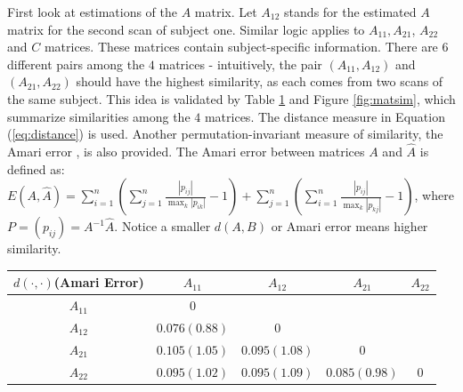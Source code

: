 \documentclass[fleqn,12pt]{article}
\let\oldref\ref
\renewcommand{\ref}[1]{(\oldref{#1})}
\begin{document}
First look at estimations of the $A$ matrix. Let $A_{12}$ stands for the estimated $A$ matrix for the second scan of subject one. Similar logic applies to $A_{11}, A_{21}$, $A_{22}$ and $C$ matrices. These matrices contain subject-specific information. There are $6$ different pairs among the $4$ matrices - intuitively, the pair $(A_{11},A_{12})$ and $(A_{21},A_{22})$ should have the highest similarity, as each comes from two scans of the same subject. This idea is validated by Table \oldref{tab:similarity} and Figure \oldref{fig:matsim}, which summarize similarities among the  $4$ matrices. The distance measure in Equation \ref{eq:distance} is used. Another permutation-invariant measure of similarity, the Amari error \citep{amari1996new}, is also provided. The Amari error between matrices $A$ and $\hat{A}$ is defined as: $E(A,\hat{A}) = \sum\limits_{i=1}^n(\sum\limits_{j=1}^n\frac{|p_{ij}|}{\max_k |p_{ik}|}-1) + \sum\limits_{j=1}^n(\sum\limits_{i=1}^n\frac{|p_{ij}|}{\max_k|p_{kj}|}-1)$, where $P =(p_{ij})=A^{-1}\hat{A}$. Notice a smaller $d(A,B)$ or Amari error means higher similarity.

\begin{table}
\centering
{}
\label{tab:similarity}
\begin{tabular}{c|cccc}
\hline
$d(\cdot,\cdot)$(Amari Error) & $A_{11}$&$A_{12}$ & $A_{21}$&$A_{22}$ \\
\hline
$A_{11}$ & $0$ &  &  &\\
$A_{12}$ & $\mathbf{0.076(0.88)}$& $0$ & &\\
$A_{21}$ & $0.105(1.05)$ & $0.095(1.08)$  & $0$ &\\
$A_{22}$ & $0.095(1.02)$ & $0.095(1.09)$ & $\mathbf{0.085(0.98)}$ & $0$ \\
\hline
\end{tabular}
\end{table}
\end{document}
